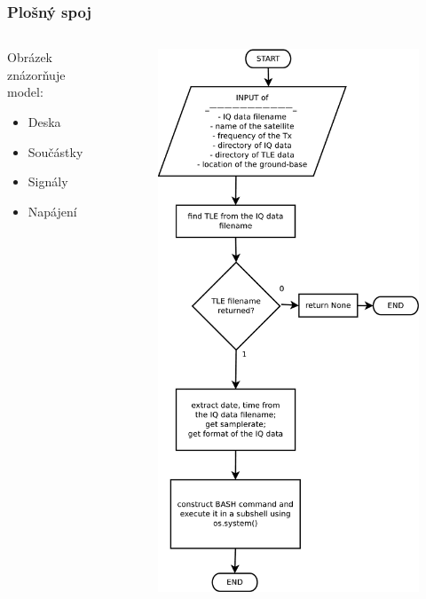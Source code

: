 \documentclass[%
  12pt,               %
  t,                  %
  aspectratio=1610,   %
  unicode,            %
czech,              %
]{beamer}              %
\begin{document}
\begin{frame} 
  \frametitle{Plošný spoj}
  
  \begin{columns}[T]                 %
    \begin{column}{0.4\textwidth}    %
      Obrázek znázorňuje model:\\[2ex]
      \begin{itemize}
        \item Deska
        \item Součástky
        \item Signály
        \item Napájení
      \end{itemize}
    \end{column}
    \begin{column}{0.6\textwidth}    %
      \begin{figure}%
        \centering
        \vspace{1cm}                %
        \includegraphics[width=0.8\columnwidth]{obrazky/get_undopplered}

\end{figure}
\end{column}
\end{columns}
\end{frame}
\end{document}
